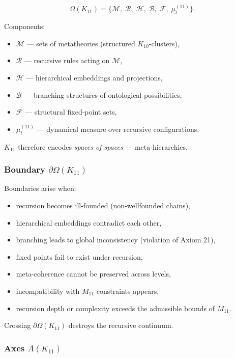 \[
\Omega(K_{11})=
\{
\mathcal{M},\;
\mathcal{R},\;
\mathcal{H},\;
\mathcal{B},\;
\mathcal{F},\;
\mu^{(11)}_t
\}.
\]

Components:
\begin{itemize}
    \item $\mathcal{M}$ — sets of metatheories (structured $K_{10}$-clusters),
    \item $\mathcal{R}$ — recursive rules acting on $\mathcal{M}$,
    \item $\mathcal{H}$ — hierarchical embeddings and projections,
    \item $\mathcal{B}$ — branching structures of ontological possibilities,
    \item $\mathcal{F}$ — structural fixed-point sets,
    \item $\mu^{(11)}_t$ — dynamical measure over recursive configurations.
\end{itemize}

$K_{11}$ therefore encodes \emph{spaces of spaces} — meta-hierarchies.

\subsubsection{Boundary $\partial\Omega(K_{11})$}

Boundaries arise when:
\begin{itemize}
    \item recursion becomes ill-founded (non-wellfounded chains),
    \item hierarchical embeddings contradict each other,
    \item branching leads to global inconsistency (violation of Axiom 21),
    \item fixed points fail to exist under recursion,
    \item meta-coherence cannot be preserved across levels,
    \item incompatibility with $M_{11}$ constraints appears,
    \item recursion depth or complexity exceeds the admissible bounds of $M_{11}$.
\end{itemize}

Crossing $\partial\Omega(K_{11})$ destroys the recursive continuum.

\subsubsection{Axes $A(K_{11})$}

